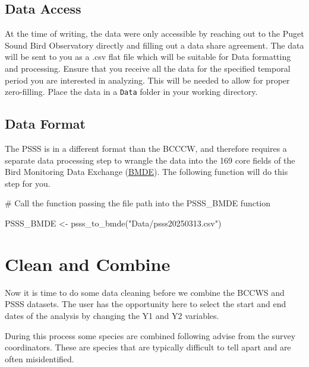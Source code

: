 \documentclass[
  letterpaper,
  DIV=11,
  numbers=noendperiod]{scrreprt}
\newenvironment{Shaded}{\begin{snugshade}}{\end{snugshade}}
\newcommand{\CommentTok}[1]{\textcolor[rgb]{0.37,0.37,0.37}{#1}}
\newcommand{\FunctionTok}[1]{\textcolor[rgb]{0.28,0.35,0.67}{#1}}
\newcommand{\NormalTok}[1]{\textcolor[rgb]{0.00,0.23,0.31}{#1}}
\newcommand{\OtherTok}[1]{\textcolor[rgb]{0.00,0.23,0.31}{#1}}
\newcommand{\StringTok}[1]{\textcolor[rgb]{0.13,0.47,0.30}{#1}}
\begin{document}
\subsection{Data Access}\label{data-access-1}

At the time of writing, the data were only accessible by reaching out to
the Puget Sound Bird Observatory directly and filling out a data share
agreement. The data will be sent to you as a .csv flat file which will
be suitable for Data formatting and processing. Ensure that you receive
all the data for the specified temporal period you are interested in
analyzing. This will be needed to allow for proper zero-filling. Place
the data in a \texttt{Data} folder in your working directory.

\subsection{Data Format}\label{data-format}

The PSSS is in a different format than the BCCCW, and therefore requires
a separate data processing step to wrangle the data into the 169 core
fields of the Bird Monitoring Data Exchange
(\href{https://naturecounts.ca/nc/default/nc_bmde.jsp}{BMDE}). The
following function will do this step for you.

\begin{Shaded}
\begin{Highlighting}[]
\CommentTok{\# Call the function passing the file path into the PSSS\_BMDE function}

\NormalTok{PSSS\_BMDE }\OtherTok{\textless{}{-}} \FunctionTok{psss\_to\_bmde}\NormalTok{(}\StringTok{"Data/psss20250313.csv"}\NormalTok{)}
\end{Highlighting}
\end{Shaded}

\section{Clean and Combine}\label{2.3Data}

Now it is time to do some data cleaning before we combine the BCCWS and
PSSS datasets. The user has the opportunity here to select the start and
end dates of the analysis by changing the Y1 and Y2 variables.

During this process some species are combined following advise from the
survey coordinators. These are species that are typically difficult to
tell apart and are often misidentified.
\end{document}
